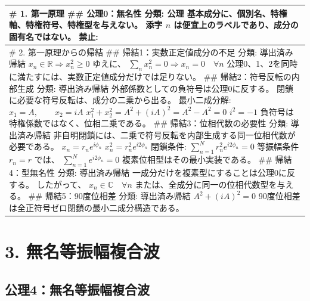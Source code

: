 \documentclass[
  a4paper,
]{ltjsarticle}
\newcounter{none} %
\begin{document}
{\def\LTcaptype{none} %
\begin{longtable}[]{@{}
  >{\raggedright\arraybackslash}p{}@{}}
\toprule\noalign{}
\begin{minipage}[b]{\linewidth}\raggedright
\# 1. 第一原理 \#\# 公理0：無名性 分類: 公理
基本成分に、個別名、特権軸、特権符号、特権型を与えない。 添字 \(n\)
は便宜上のラベルであり、成分の固有名ではない。 禁止:
\end{minipage} \\
\midrule\noalign{}
\endhead
\bottomrule\noalign{}
\endlastfoot
\# 2. 第一原理からの帰結 \#\# 帰結1：実数正定値成分の不足 分類:
導出済み帰結 \(
x_n\in\mathbb{R}
\Rightarrow
x_n^2\ge0
\) ゆえに、 \(
\sum_n x_n^2=0
\Rightarrow
x_n=0\quad\forall n
\) 公理0、1、2を同時に満たすには、実数正定値成分だけでは足りない。 \#\#
帰結2：符号反転の内部生成 分類: 導出済み帰結
外部係数としての負符号は公理0に反する。
閉鎖に必要な符号反転は、成分の二乗から出る。 最小二成分解: \(
x_1=A,\qquad x_2=iA
\) \(
x_1^2+x_2^2=A^2+(iA)^2=A^2-A^2=0
\) \(
i^2=-1
\) 負符号は特権係数ではなく、位相二乗である。 \#\#
帰結3：位相代数の必要性 分類: 導出済み帰結
非自明閉鎖には、二乗で符号反転を内部生成する同一位相代数が必要である。
\(
x_n=r_n e^{i\phi_n}
\) \(
x_n^2=r_n^2e^{i2\phi_n}
\) 閉鎖条件: \(
\sum_{n=1}^{N}r_n^2e^{i2\phi_n}=0
\) 等振幅条件 \(r_n=r\) では、 \(
\sum_{n=1}^{N}e^{i2\phi_n}=0
\) 複素位相型はその最小実装である。 \#\# 帰結4：型無名性 分類:
導出済み帰結 一成分だけを複素型にすることは公理0に反する。 したがって、
\(
x_n\in\mathbb{C}\quad\forall n
\) または、全成分に同一の位相代数型を与える。 \#\# 帰結5：90度位相差
分類: 導出済み帰結 \(
A^2+(iA)^2=0
\) 90度位相差は全正符号ゼロ閉鎖の最小二成分構造である。 \\
\end{longtable}
}

\section{3.
無名等振幅複合波}\label{ux7121ux540dux7b49ux632fux5e45ux8907ux5408ux6ce2}

\subsection{公理4：無名等振幅複合波}\label{ux516cux74064ux7121ux540dux7b49ux632fux5e45ux8907ux5408ux6ce2}
\end{document}
